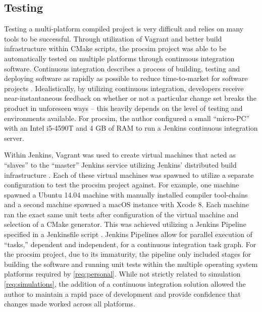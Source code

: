 \subsection{Testing}

Testing a multi-platform compiled project is very difficult and relies on many tools to be successful. Through utilization of Vagrant and better build infrastructure within CMake scripts, the procsim project was able to be automatically tested on multiple platforms through continuous integration software. Continuous integration describes a process of building, testing and deploying software as rapidly as possible to reduce time-to-market for software projects \cite{Stolberg2009}. Idealistically, by utilizing continuous integration, developers receive near-instantaneous feedback on whether or not a particular change set breaks the product in unforeseen ways -- this heavily depends on the level of testing and environments available. For procsim, the author configured a small ``micro-PC'' with an Intel \textregistered{} i5-4590T and 4 GB of RAM to run a Jenkins \cite{Jenkins:Home} continuous integration server. 

Within Jenkins, Vagrant was used to create virtual machines that acted as ``slaves'' to the ``master'' Jenkins service utilizing Jenkins' distributed build infrastructure \cite{Jenkins:DistributedBuilds}. Each of these virtual machines was spawned to utilize a separate configuration to test the procsim project against. For example, one machine spawned a Ubuntu 14.04 machine with manually installed compiler tool-chains and a second machine spawned a macOS instance with Xcode 8. Each machine ran the exact same unit tests after configuration of the virtual machine and selection of a CMake generator. This was achieved utilizing a Jenkins Pipeline \cite{Jenkins:Pipeline} specified in a Jenkinsfile script \cite{Jenkins:Pipeline:Jenkinsfile}. Jenkins Pipelines allow for parallel execution of ``tasks,'' dependent and independent, for a continuous integration task graph. For the procsim project, due to its immaturity, the pipeline only included stages for building the software and running unit tests within the multiple operating system platforms required by \cref{req:personal}. While not strictly related to simulation \cref{req:simulations}, the addition of a continuous integration solution allowed the author to maintain a rapid pace of development and provide confidence that changes made worked across all platforms.  

